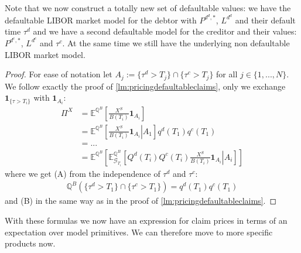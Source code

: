 \documentclass[12pt]{article}
\begin{document}
	Note that we now construct a totally new set of defaultable values: we have the defaultable LIBOR market model for the debtor with $P^{d^d,*}$, $L^{d^d}$ and their default time $\tau^d$ and we have a second defaultable model for the creditor and their values: $P^{d^c,*}$, $L^{d^c}$ and $\tau^c$. At the same time we still have the underlying non defaultable LIBOR market model.
	\begin{proof}
		For ease of notation let $A_j := \{\tau^d > T_j\} \cap\{\tau^c > T_j\}$ for all $j \in \{1, ..., N\}$.
		We follow exactly the proof of \cref{lm:pricingdefaultableclaims}, only we exchange $\mathbf{1}_{\{\tau > T_i\}}$ with $\mathbf{1}_{A_i}$:
		\begin{align*}
			\Pi^X &=  \mathbb{E}^{\mathbb{Q}^B}\left[\frac{X^S}{B(T_i)} \mathbf{1}_{A_i} \right]\\
		 	&=
		 	\mathbb{E}^{\mathbb{Q}^B}\left[\left.\frac{X^S}{B(T_i)} \mathbf{1}_{A_i} \right| A_1 \right]q^d(T_1)q^c(T_1)\tag{A}\\
		 	&=...\\
		 	&= \mathbb{E}^{\mathbb{Q}^B}\left[\mathbb{E}^{\mathbb{Q}^B}_{\mathcal{G}_{T_i}}\left[\left.Q^d(T_i)Q^c(T_i)\frac{X^S}{B(T_i)} \mathbf{1}_{A_i} \right| A_i \right]\right]\tag{B}
		\end{align*}
		where we get (A) from the independence of $\tau^d$ and $\tau^c$:
		\begin{align*}
		 	\mathbb{Q}^B\left(\{\tau^d > T_1\} \cap\{\tau^c > T_1\}\right) = q^d(T_1)q^c(T_1)
		\end{align*}
		and (B) in the same way as in the proof of \cref{lm:pricingdefaultableclaims}.
	\end{proof}
	
	
	With these formulas we now have an expression for claim prices in terms of an expectation over model primitives. We can therefore move to more specific products now.
	
\end{document}

